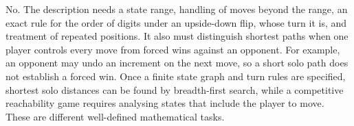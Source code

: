 No. The description needs a state range, handling of moves beyond the range, an exact rule for the order of digits under an upside-down flip, whose turn it is, and treatment of repeated positions. It also must distinguish shortest paths when one player controls every move from forced wins against an opponent. For example, an opponent may undo an increment on the next move, so a short solo path does not establish a forced win. Once a finite state graph and turn rules are specified, shortest solo distances can be found by breadth-first search, while a competitive reachability game requires analysing states that include the player to move. These are different well-defined mathematical tasks.
